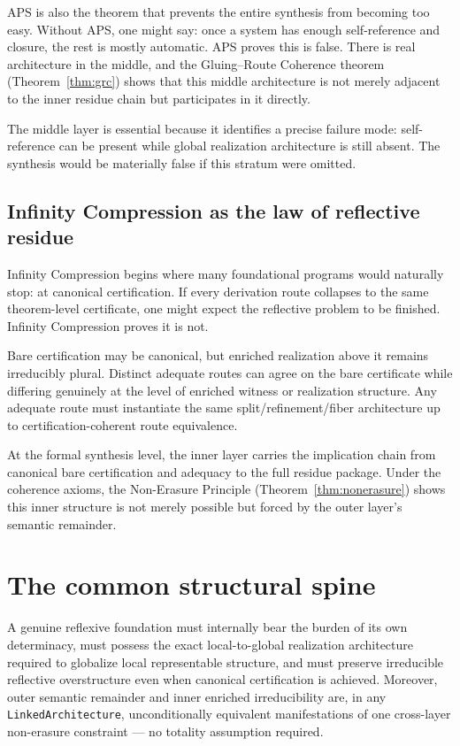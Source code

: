 \documentclass[11pt]{article}
\begin{document}
APS is also the theorem that prevents the entire synthesis from becoming too easy.
Without APS, one might say: once a system has enough self-reference and closure, the
rest is mostly automatic.  APS proves this is false.  There is real architecture in the
middle, and the Gluing--Route Coherence theorem (Theorem~\ref{thm:grc}) shows that this
middle architecture is not merely adjacent to the inner residue chain but participates
in it directly.

The middle layer is essential because it identifies a precise failure mode: self-reference
can be present while global realization architecture is still absent.  The synthesis would
be materially false if this stratum were omitted.

\subsection{Infinity Compression as the law of reflective residue}

Infinity Compression \cite{SpivackIC2026} begins where many foundational programs would
naturally stop: at canonical certification.  If every derivation route collapses to the
same theorem-level certificate, one might expect the reflective problem to be finished.
Infinity Compression proves it is not.

Bare certification may be canonical, but enriched realization above it remains
irreducibly plural.  Distinct adequate routes can agree on the bare certificate while
differing genuinely at the level of enriched witness or realization structure.  Any
adequate route must instantiate the same split/refinement/fiber architecture up to
certification-coherent route equivalence.

At the formal synthesis level, the inner layer carries the implication chain from
canonical bare certification and adequacy to the full residue package.  Under the
coherence axioms, the Non-Erasure Principle (Theorem~\ref{thm:nonerasure}) shows this
inner structure is not merely possible but forced by the outer layer's semantic remainder.

\section{The common structural spine}
\label{sec:spine}

\begin{principle}
A genuine reflexive foundation must internally bear the burden of its own determinacy,
must possess the exact local-to-global realization architecture required to globalize
local representable structure, and must preserve irreducible reflective overstructure
even when canonical certification is achieved.  Moreover, outer semantic remainder and inner enriched irreducibility are, in any
\texttt{LinkedArchitecture}, unconditionally equivalent manifestations of one
cross-layer non-erasure constraint --- no totality assumption required.
\end{principle}
\end{document}
